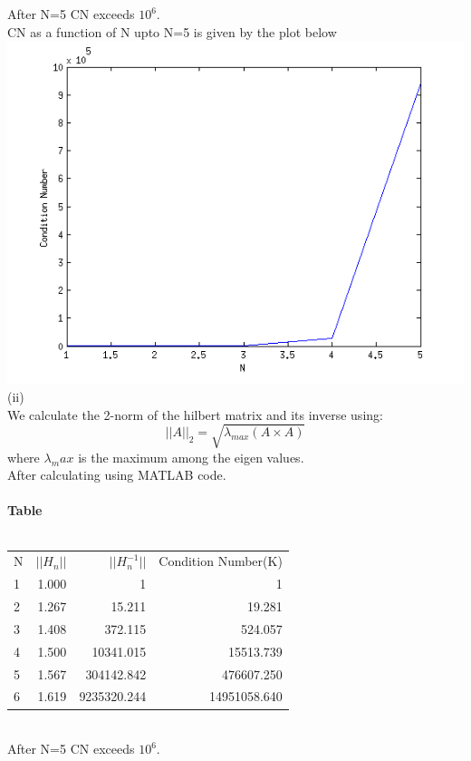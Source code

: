 \documentclass[a4paper,12pt]{article}
\begin{document}
\\
\\
After N=5 CN exceeds $10^6$.\\
CN as a function of N upto N=5 is given by the plot below\\
\includegraphics [keepaspectratio=true] {1norm.png}
\newpage
\textbf{ } \\
(ii)\\
We calculate the 2-norm of the hilbert matrix and its inverse using:\\
\[ ||A||_2 = \sqrt{\lambda_{max}(A\times A)} \] 
where $\lambda_max$ is the maximum among the eigen values.\\
After calculating using MATLAB code.\\
\\
\textbf{Table}\\
\\
\begin{tabular}{ l r r r }
 N & $||H_n||$ & $||H^{-1}_n||$ & Condition Number(K)\\
 1 & 1.000 & 1 & 1 \\
 2 & 1.267 & 15.211 & 19.281 \\
 3 & 1.408 & 372.115 & 524.057 \\
 4 & 1.500 & 10341.015 & 15513.739 \\
 5 & 1.567 & 304142.842 & 476607.250 \\
 6 & 1.619 & 9235320.244 & 14951058.640 \\
\end{tabular}
\\
After N=5 CN exceeds $10^6$.\\
\end{document}
